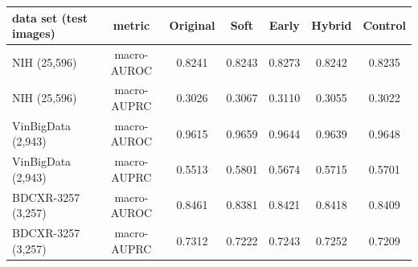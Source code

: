 \begin{tabular}{lcccccc}
\toprule
data set (test images) & metric & Original & Soft & Early & Hybrid & Control \\
\midrule
NIH (25,596) & macro-AUROC & 0.8241 & 0.8243 & 0.8273 & 0.8242 & 0.8235 \\
NIH (25,596) & macro-AUPRC & 0.3026 & 0.3067 & 0.3110 & 0.3055 & 0.3022 \\
VinBigData (2,943) & macro-AUROC & 0.9615 & 0.9659 & 0.9644 & 0.9639 & 0.9648 \\
VinBigData (2,943) & macro-AUPRC & 0.5513 & 0.5801 & 0.5674 & 0.5715 & 0.5701 \\
BDCXR-3257 (3,257) & macro-AUROC & 0.8461 & 0.8381 & 0.8421 & 0.8418 & 0.8409 \\
BDCXR-3257 (3,257) & macro-AUPRC & 0.7312 & 0.7222 & 0.7243 & 0.7252 & 0.7209 \\
\bottomrule
\end{tabular}
